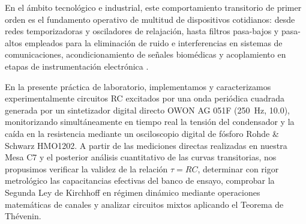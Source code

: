 En el ámbito tecnológico e industrial, este comportamiento transitorio de primer orden es el fundamento operativo de multitud de dispositivos cotidianos: desde redes temporizadoras y osciladores de relajación, hasta filtros pasa-bajos y pasa-altos empleados para la eliminación de ruido e interferencias en sistemas de comunicaciones, acondicionamiento de señales biomédicas y acoplamiento en etapas de instrumentación electrónica \cite{boylestad}.

En la presente práctica de laboratorio, implementamos y caracterizamos experimentalmente circuitos RC excitados por una onda periódica cuadrada generada por un sintetizador digital directo OWON AG 051F (\qty{250}{\hertz}, \qty{10,0}{\voltpp}), monitorizando simultáneamente en tiempo real la tensión del condensador y la caída en la resistencia mediante un osciloscopio digital de fósforo Rohde \& Schwarz HMO1202. A partir de las mediciones directas realizadas en nuestra Mesa C7 y el posterior análisis cuantitativo de las curvas transitorias, nos propusimos verificar la validez de la relación $\tau = RC$, determinar con rigor metrológico las capacitancias efectivas del banco de ensayo, comprobar la Segunda Ley de Kirchhoff en régimen dinámico mediante operaciones matemáticas de canales y analizar circuitos mixtos aplicando el Teorema de Thévenin.